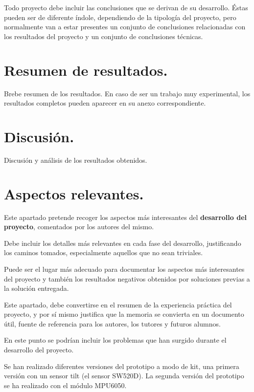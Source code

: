 
Todo proyecto debe incluir las conclusiones que se derivan de su desarrollo. Éstas pueden ser de diferente índole, dependiendo de la tipología del proyecto, pero normalmente van a estar presentes un conjunto de conclusiones relacionadas con los resultados del proyecto y un conjunto de conclusiones técnicas. 

\section{Resumen de resultados.}

Brebe resumen de los resultados. En caso de ser un trabajo muy experimental, los resultados completos pueden aparecer en su anexo correspondiente.

\section{Discusión.}

Discusión y análisis de los resultados obtenidos.


\section{Aspectos relevantes.}

Este apartado pretende recoger los aspectos más interesantes del \textbf{desarrollo del proyecto}, comentados por los autores del mismo.

Debe incluir los detalles más relevantes en cada fase del desarrollo, justificando los caminos tomados, especialmente aquellos que no sean triviales. 

Puede ser el lugar más adecuado para documentar los aspectos más interesantes del proyecto y también los resultados negativos obtenidos por soluciones previas a la solución entregada.

Este apartado, debe convertirse en el resumen de la experiencia práctica del proyecto, y por sí mismo justifica que la memoria se convierta en un documento útil, fuente de referencia para los autores, los tutores y futuros alumnos.

En este punto se podrían incluir los problemas que han surgido durante el desarrollo del proyecto.

Se han realizado diferentes versiones del prototipo a modo de kit, una primera versión con un sensor tilt (el sensor SW520D). 
La segunda versión del prototipo se ha realizado con el módulo MPU6050.





